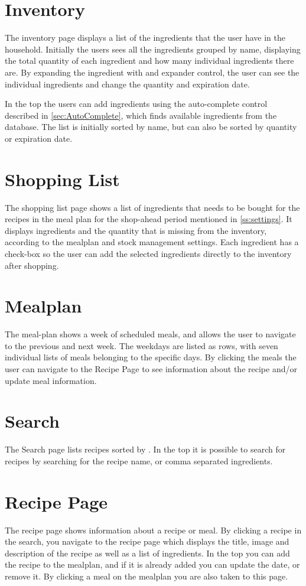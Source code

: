 \section{Inventory} \label{ss:inventory}
The inventory page displays a list of the ingredients that the user have in the household. Initially the users sees all the ingredients grouped by name, displaying the total quantity of each ingredient and how many individual ingredients there are. By expanding the ingredient with and expander control, the user can see the individual ingredients and change the quantity and expiration date.

In the top the users can add ingredients using the auto-complete control described in \cref{sec:AutoComplete}, which finds available ingredients from the database. The list is initially sorted by name, but can also be sorted by quantity or expiration date.

\section{Shopping List}
The shopping list page shows a list of ingredients that needs to be bought for the recipes in the meal plan for the shop-ahead period mentioned in \cref{ss:settings}. It displays ingredients and the quantity that is missing from the inventory, according to the mealplan and stock management settings. Each ingredient has a check-box so the user can add the selected ingredients directly to the inventory after shopping.

\section{Mealplan}
The meal-plan shows a week of scheduled meals, and allows the user to navigate to the previous and next week. The weekdays are listed as rows, with seven individual lists of meals belonging to the specific days. By clicking the meals the  user can navigate to the Recipe Page to see information about the recipe and/or update meal information.

\section{Search}
The Search page lists recipes sorted by .
In the top it is possible to search for recipes by searching for the recipe name, or comma separated ingredients.

\section{Recipe Page}
The recipe page shows information about a recipe or meal. By clicking a recipe in the search, you navigate to the recipe page which displays the title, image and description of the recipe as well as a list of ingredients. In the top you can add the recipe to the mealplan, and if it is already added you can update the date, or remove it.
By clicking a meal on the mealplan you are also taken to this page.

